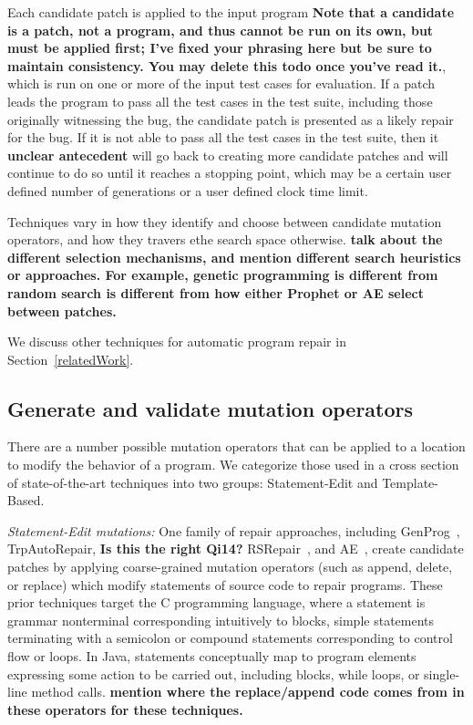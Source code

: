 \documentclass[conference]{IEEEtran}
\newcommand{\todo}[1]
  {{\scriptsize \textbf{\color{red} {#1}}}}
\begin{document}
Each candidate patch is applied to the input program \todo{Note that a candidate
  is a patch, not a program, and thus cannot be run on its own, but must be
  applied first; I've fixed your phrasing here but be sure to maintain
  consistency.  You may delete this todo once you've read it.}, which is run on
one or more of the input test cases for evaluation.  If a patch leads the
program to 
pass all the test cases in the test suite, including those originally witnessing
the bug, the candidate patch is presented as a likely repair for the bug. 
If it is not able to pass all the test cases in 
the test suite, then it\todo{unclear antecedent} will go back to creating more candidate patches and will 
continue to do so until it reaches a stopping point, which may be a certain user 
defined number of generations or a user defined clock time limit.

Techniques vary in how they identify and choose between candidate mutation
operators, and how they travers ethe search space otherwise. \todo{talk about
  the different selection mechanisms, and mention different search heuristics or
  approaches.  For example, genetic programming is different from random search
  is different from how either Prophet or AE select between patches.}

We discuss other techniques for automatic program repair in
Section~\ref{relatedWork}.

\subsection{Generate and validate mutation operators} 
\label{categorization}

There are a number possible mutation operators that can be applied to a location 
to modify the behavior of a program.  We categorize those used in a cross
section of state-of-the-art techniques into two groups: 
Statement-Edit and Template-Based. 

\emph{Statement-Edit mutations:}
One family of repair approaches, including GenProg~\cite{legoues12}, 
TrpAutoRepair\cite{Qi13},\todo{Is this the right Qi14?} RSRepair~\cite{Qi14}, and AE~\cite{Weimer13},
create candidate 
patches by applying coarse-grained mutation operators (such as append, delete, or 
replace) which modify statements of source code to 
repair programs. These prior techniques target the C programming language, where
a statement is grammar nonterminal corresponding intuitively to blocks,
simple statements terminating
with a semicolon or compound statements corresponding to control flow or
loops. In Java, statements conceptually map to program elements expressing
some action to be carried out, including blocks,  while loops, or single-line
method calls. \todo{mention where the replace/append code comes from in these
  operators for these techniques.}
\end{document}
